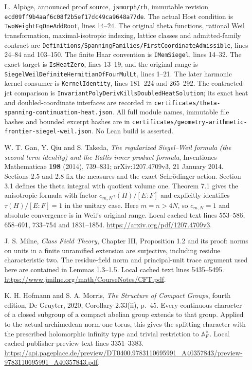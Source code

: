 L. Alp\"oge, announced proof source, \texttt{jsmorph/rh},
immutable revision \texttt{ecd09ff9b4aaf6c08f2b5ef17dc49ca9648a77de}.
The actual Host condition is
\texttt{TwoWeightEqOneAddRoot}, lines 14--24.
The original theta functions, rational Weil transformation,
maximal-isotropic indexing, lattice classes and admitted-family
contract are \texttt{Definitions/SpanningFamilies/FirstCoordinateAdmissible},
lines 24--84 and 103--150. The finite Haar convention is
\texttt{IMemSiegel}, lines 14--32. The exact target is
\texttt{IsHeatZero}, lines 13--19, and the original range is
\texttt{SiegelWeilDefiniteHermitianOfFourMulLt}, lines 1--21.
The later harmonic kernel consumer is
\texttt{KernelIdentity}, lines 181--224 and 265--292.
The contracted-jet comparison is
\texttt{InvariantPolyDerivKillsDoubledHeatSolution}; its exact heat
and doubled-coordinate interfaces are recorded in
\texttt{certificates/theta-spanning-continuation-heat.json}.
All full module names, immutable file hashes and bounded excerpt
hashes are in
\texttt{certificates/geometry-arithmetic-frontier-siegel-weil.json}.
No Lean build is asserted.

W. T. Gan, Y. Qiu and S. Takeda,
\emph{The regularized Siegel--Weil formula (the second term
identity) and the Rallis inner product formula},
Inventiones Mathematicae \textbf{198} (2014), 739--831;
arXiv:1207.4709v3, 21 January 2014.
Sections 2.5 and 2.8 fix the measures and the exact
Schr\"odinger action. Section 3.1 defines the theta integral
with quotient volume one. Theorem 7.1 gives the anisotropic
formula with factor $c_{m,N}\tau(H)/[E:F]$ and explicitly
identifies $\tau(H)/[E:F]=1$ in the unitary case.
Here $m=n>4N$, so $c_{m,N}=1$ and absolute convergence is
in Weil's original range. Local cached text lines 553--586,
658--691, 733--754 and 1831--1854.
\url{https://arxiv.org/pdf/1207.4709v3}.

J. S. Milne, \emph{Class Field Theory}, Chapter III,
Proposition 1.2 and its proof: norms on units in a finite
unramified extension are surjective, including residue
characteristic two. The residue-field norm and principal-unit
trace argument used here are contained in Lemmas 1.3--1.5.
Local cached text lines 5435--5495.
\url{https://www.jmilne.org/math/CourseNotes/CFT.pdf}.

K. H. Hofmann and S. A. Morris,
\emph{The Structure of Compact Groups}, fourth edition,
De Gruyter, 2020, Corollary 2.33(ii), p.\ 45.
Every continuous character of a closed subgroup of a compact
abelian group extends to that group. Applied to the actual
archimedean norm-one torus, this gives the splitting character
with the prescribed holomorphic infinity type and trivial
restriction to $\mathbb A_F^\times$.
Local cached publisher-preview text lines 3351--3383.
\url{https://api.pageplace.de/preview/DT0400.9783110695991_A40357843/preview-9783110695991_A40357843.pdf}.
